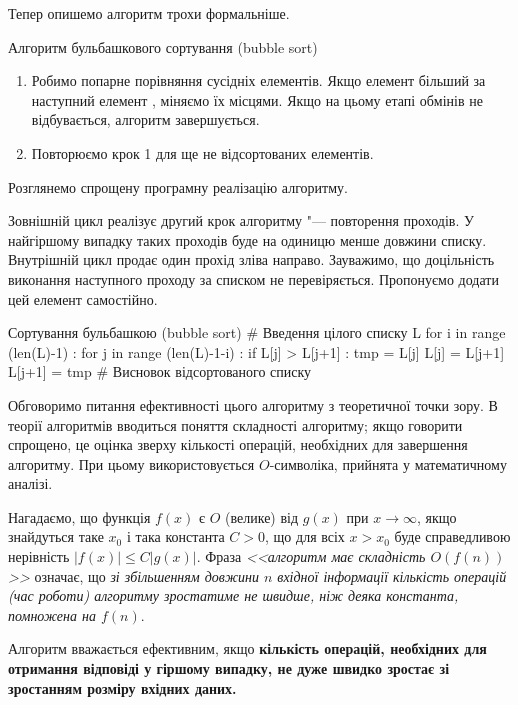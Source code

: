 Тепер опишемо алгоритм трохи формальніше.
\begin{defn}{Алгоритм бульбашкового сортування (bubble sort)}
\begin{enumerate}
\item Робимо попарне порівняння сусідніх елементів. Якщо елемент \mi{[j]} більший за наступний елемент \mi{[j+1]}, міняємо їх місцями. Якщо на цьому етапі обмінів не відбувається, алгоритм завершується.
\item Повторюємо крок 1  для ще не відсортованих елементів.
\end{enumerate}
\end{defn}

Розглянемо спрощену програмну реалізацію алгоритму.

Зовнішній цикл реалізує другий крок алгоритму "---
повторення проходів. У найгіршому випадку таких проходів буде на одиницю менше довжини списку. Внутрішній цикл продає один прохід зліва направо. Зауважимо, що доцільність виконання наступного проходу за списком не перевіряється. Пропонуємо додати цей елемент самостійно.

\begin{py}{Сортування бульбашкою (bubble sort)}
# Введення цілого списку L
for i in range (len(L)-1) :
    for j in range (len(L)-1-i) :
        if L[j] > L[j+1] :
            tmp = L[j]
            L[j] = L[j+1]
            L[j+1] = tmp
# Висновок відсортованого списку
\end{py}

Обговоримо питання ефективності цього алгоритму з теоретичної точки зору. В теорії алгоритмів вводиться поняття складності алгоритму; якщо говорити спрощено, це оцінка зверху кількості операцій, необхідних для завершення алгоритму. При цьому використовується $ O $-символіка, прийнята у математичному аналізі.

Нагадаємо, що функція $ f (x)$ є $ O $ (велике) від $ g (x)$ при $ x \to \infty $, якщо знайдуться таке $ x _0$ і така константа $ C >0$, що для всіх $ x > x _0$ буде справедливою нерівність $\left | f (x) \right | \leqslant C \left | g (x) \right | $. Фраза \textit{<<алгоритм має складність $ O (f (n))$>>} означає, що \textit{зі збільшенням довжини $ n $ вхідної інформації кількість операцій (час роботи) алгоритму зростатиме не швидше, ніж деяка константа, помножена на $ f (n)$}.

\begin{defn}{Алгоритм вважається ефективним, якщо} \textbf{кількість операцій, необхідних для отримання відповіді у гіршому випадку, не дуже швидко зростає зі зростанням розміру вхідних даних.}
\end{defn}

